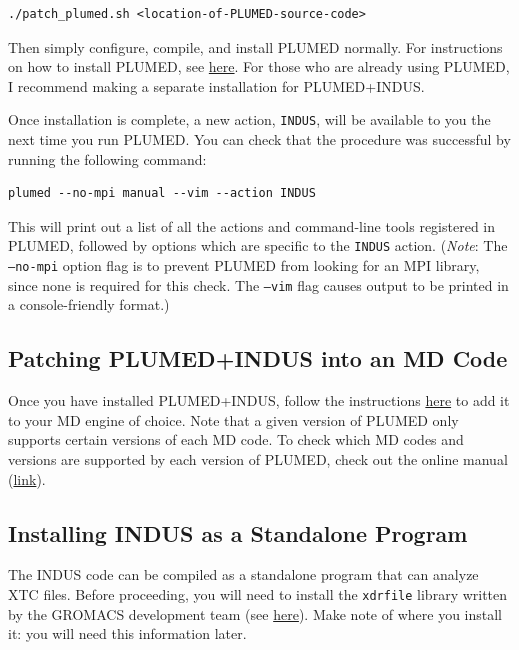 \documentclass[11pt,notitlepage]{article}
\newcommand{\plumedmanual}[1][link]{\href{https://plumed.github.io/doc.html}{#1}}
\newcommand{\plumeddoc}{https://plumed.github.io/doc-v2.4/user-doc/html}
\newcommand{\installplumed}[1][link]{\href{\plumeddoc/_installation.html}{#1}}
\begin{document}
\begin{lstlisting}
./patch_plumed.sh <location-of-PLUMED-source-code>
\end{lstlisting}

Then simply configure, compile, and install PLUMED normally. For instructions on how to install PLUMED, see \installplumed[here]. For those who are already using PLUMED, I recommend making a separate installation for PLUMED+INDUS.

Once installation is complete, a new action, \texttt{INDUS}, will be available to you the next time you run PLUMED. You can check that the procedure was successful by running the following command:

\begin{lstlisting}
plumed --no-mpi manual --vim --action INDUS
\end{lstlisting}

This will print out a list of all the actions and command-line tools registered in PLUMED, followed by options which are specific to the \texttt{INDUS} action. (\emph{Note}: The \texttt{--no-mpi} option flag is to prevent PLUMED from looking for an MPI library, since none is required for this check. The \texttt{--vim} flag causes output to be printed in a console-friendly format.)


\subsection{Patching PLUMED+INDUS into an MD Code}

Once you have installed PLUMED+INDUS, follow the instructions \href{\plumeddoc/_installation.html#Patching}{here} to add it to your MD engine of choice. Note that a given version of PLUMED only supports certain versions of each MD code. To check which MD codes and versions are supported by each version of PLUMED, check out the online manual (\plumedmanual).


\subsection{Installing INDUS as a Standalone Program}

The INDUS code can be compiled as a standalone program that can analyze XTC files. Before proceeding, you will need to install the \texttt{xdrfile} library written by the GROMACS development team (see \href{http://www.gromacs.org/Developer_Zone/Programming_Guide/XTC_Library}{here}). Make note of where you install it: you will need this information later.
\end{document}
